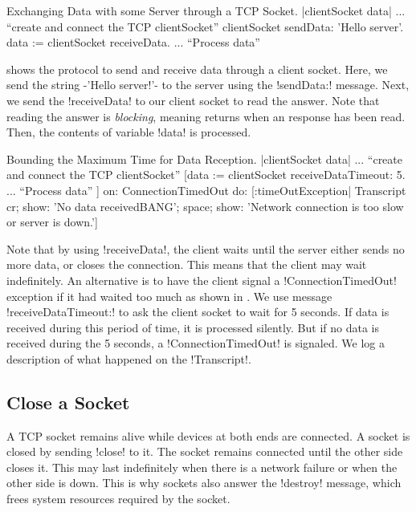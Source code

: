 \documentclass[a4paper,10pt,twoside]{book}
\begin{document}
\begin{script}[dataExhangeWithTcpSocket]{Exchanging Data with some Server through a TCP Socket.}
|clientSocket data|
... ``create and connect the TCP clientSocket''
clientSocket sendData: 'Hello server'.
data := clientSocket receiveData.
... ``Process data''
\end{script}

 shows the protocol to send and receive data through a client socket.
Here, we send the string \ct-'Hello server!'- to the server using the \ct!sendData:! message.
Next, we send the \ct!receiveData! to our client socket to read the answer. Note that reading the answer is \emph{blocking}, meaning  returns when an response has been read. Then, the contents of variable \ct!data! is processed.

\begin{script}[dataReceptionTimeOut]{Bounding the Maximum Time for Data Reception.}
|clientSocket data|
... ``create and connect the TCP clientSocket''
[data := clientSocket receiveDataTimeout: 5.
... ``Process data''
] on: ConnectionTimedOut 
do: [:timeOutException|
	Transcript 
		cr; 
		show: 'No data receivedBANG';
		space;
		show: 'Network connection is too slow or server is down.']
\end{script}

Note that by using  \ct!receiveData!, the client waits until the server either sends no more data, or closes the connection.
This means that the client may wait indefinitely.
An alternative is to have the client signal a \ct!ConnectionTimedOut! exception if it had waited too much as shown in .
We use message \ct!receiveDataTimeout:! to ask the client socket to wait for 5 seconds.
If data is received during this period of time, it is processed silently.
But if no data is received during the 5 seconds, a \ct!ConnectionTimedOut! is signaled.
We log a description of what happened on the \ct!Transcript!.

\subsection{Close a Socket}
A TCP socket remains alive while devices at both ends are connected.
A socket is closed by sending \ct!close! to it.
The socket remains connected until the other side closes it.
This may last indefinitely when there is a network failure or when the other side is down.
This is why sockets also answer the \ct!destroy! message, which frees system resources required by the socket.
\end{document}
